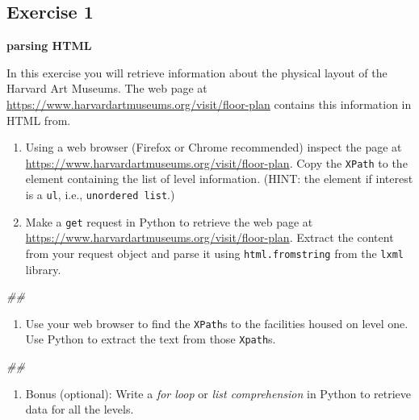 \documentclass[
]{book}
\newenvironment{Shaded}{\begin{snugshade}}{\end{snugshade}}
\newcommand{\CommentTok}[1]{\textcolor[rgb]{0.56,0.35,0.01}{\textit{#1}}}
\providecommand{\tightlist}{%
  \setlength{\itemsep}{0pt}\setlength{\parskip}{0pt}}
\begin{document}
\hypertarget{exercise-1-5}{%
\subsection{Exercise 1}\label{exercise-1-5}}

\textbf{parsing HTML}

In this exercise you will retrieve information about the physical layout of the Harvard Art Museums. The web page at
\url{https://www.harvardartmuseums.org/visit/floor-plan} contains this information in HTML from.

\begin{enumerate}
\def\labelenumi{\arabic{enumi}.}
\item
  Using a web browser (Firefox or Chrome recommended) inspect the
  page at \url{https://www.harvardartmuseums.org/visit/floor-plan}. Copy
  the \texttt{XPath} to the element containing the list of level
  information. (HINT: the element if interest is a \texttt{ul}, i.e.,
  \texttt{unordered\ list}.)
\item
  Make a \texttt{get} request in Python to retrieve the web page at
  \url{https://www.harvardartmuseums.org/visit/floor-plan}. Extract the
  content from your request object and parse it using \texttt{html.fromstring}
  from the \texttt{lxml} library.
\end{enumerate}

\begin{Shaded}
\begin{Highlighting}[]
\CommentTok{\#\#}
\end{Highlighting}
\end{Shaded}

\begin{enumerate}
\def\labelenumi{\arabic{enumi}.}
\setcounter{enumi}{2}
\tightlist
\item
  Use your web browser to find the \texttt{XPath}s to the facilities housed on
  level one. Use Python to extract the text from those \texttt{Xpath}s.
\end{enumerate}

\begin{Shaded}
\begin{Highlighting}[]
\CommentTok{\#\#}
\end{Highlighting}
\end{Shaded}

\begin{enumerate}
\def\labelenumi{\arabic{enumi}.}
\setcounter{enumi}{3}
\tightlist
\item
  Bonus (optional): Write a \emph{for loop} or \emph{list comprehension} in Python
  to retrieve data for all the levels.
\end{enumerate}
\end{document}
